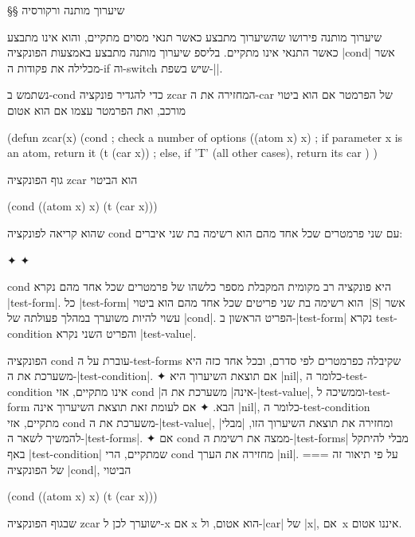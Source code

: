 §§ שיערוך מותנה ורקורסיה

שיערוך מותנה פירושו שהשיערוך מתבצע כאשר תנאי מסוים מתקיים, והוא אינו מתבצע
כאשר התנאי אינו מתקיים. בליספ שיערוך מותנה מתבצע באמצעות הפונקציה \E|cond|
אשר מכלילה את פקודות ה-if וה-switch שיש בשפת-\E|\CPL|.

נשתמש ב-cond כדי להגדיר פונקציה zcar המחזירה את ה-car של הפרמטר אם
הוא ביטוי מורכב, ואת הפרמטר עצמו אם הוא אטום
\begin{LISP}
(defun zcar(x)
  (cond ; check a number of options
    ((atom x) x) ; if parameter x is an atom, return it
    (t (car x)) ; else, if 'T' (all other cases), return its car
)
)
\end{LISP}
גוף הפונקציה zcar הוא הביטוי
\begin{LISP}
  (cond ((atom x) x) (t (car x)))
\end{LISP}
שהוא קריאה לפונקציה cond עם שני פרמטרים שכל אחד מהם הוא רשימה בת שני איברים:
\begin{LTR}
  \begin{itemize}
    ✦ 
    ✦ 
  \end{itemize}
\end{LTR}
cond היא פונקציה רב מקומית המקבלת מספר כלשהו של פרמטרים שכל אחד מהם נקרא
\E|test-form|. כל \E|test-form| הוא רשימה בת שני פריטים שכל אחד מהם הוא ביטוי~\E|S|
אשר עשוי להיות משוערך במהלך פעולתה של \E|cond|. הפריט הראשון ב-\E|test-form|
נקרא test-condition והפריט השני נקרא \E|test-value|.

הפונקציה cond עוברת על ה-test-forms שקיבלה כפרמטרים לפי סדרם, ובכל אחד כזה היא
משערכת את ה-\E|test-condition|.
✦ אם תוצאת השיערוך היא \E|nil|, כלומר ה-test-condition אינו מתקיים, אזי cond
\ע|אינה| משערכת את ה-\E|test-value|, וממשיכה ל-test-form הבא.
✦ אם לעומת זאת תוצאת השיערוך אינה \E|nil|, כלומר ה-test-condition מתקיים, אזי
cond משערכת את ה-\E|test-value|, ומחזירה את תוצאת השיערוך הזו, \ע|מבלי|
להמשיך לשאר ה-\E|test-forms|.
✦ אם cond ממצה את רשימת ה-\E|test-forms| מבלי להיתקל באף \E|test-condition|
שמתקיים, הרי cond מחזירה את הערך \E|nil|.
===
על פי תיאור זה של הפונקציה \E|cond|, הביטוי \begin{LISP}
  (cond ((atom x) x) (t (car x)))
\end{LISP}
שבגוף הפונקציה zcar ישוערך לכן ל-x אם x הוא אטום, ול-\E|car| של \E|x|, אם~x
איננו אטום.

